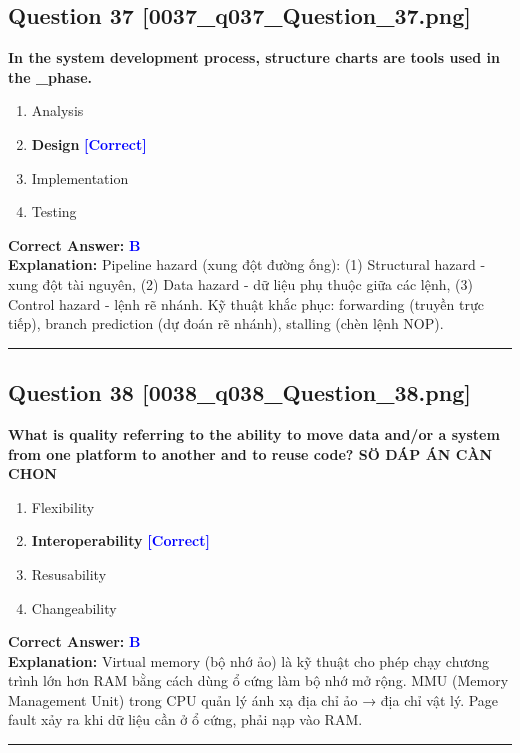 \documentclass[11pt,a4paper]{article}
\begin{document}
\begin{minipage}{\textwidth}
\subsection*{Question 37 \quad \footnotesize{[0037\_q037\_Question\_37.png]}}
\noindent \textbf{In the system development process, structure charts are tools used in the \_phase.}

\begin{enumerate}[label=\Alph*.]
    \item Analysis
    \item \textbf{Design} \hfill \textcolor{blue}{\textbf{[Correct]}}
    \item Implementation
    \item Testing
\end{enumerate}

\noindent \textbf{Correct Answer:} \textcolor{blue}{\textbf{B}} \\[2pt]
\noindent \textbf{Explanation:} Pipeline hazard (xung đột đường ống): (1) Structural hazard - xung đột tài nguyên, (2) Data hazard - dữ liệu phụ thuộc giữa các lệnh, (3) Control hazard - lệnh rẽ nhánh. Kỹ thuật khắc phục: forwarding (truyền trực tiếp), branch prediction (dự đoán rẽ nhánh), stalling (chèn lệnh NOP).

\par\vspace{0.3cm}
\hrule
\vspace{0.3cm}
\end{minipage}

\begin{minipage}{\textwidth}
\subsection*{Question 38 \quad \footnotesize{[0038\_q038\_Question\_38.png]}}
\noindent \textbf{What is quality referring to the ability to move data and/or a system from one platform to another and to reuse code? SÖ DÁP ÁN CÀN CHON}

\begin{enumerate}[label=\Alph*.]
    \item Flexibility
    \item \textbf{Interoperability} \hfill \textcolor{blue}{\textbf{[Correct]}}
    \item Resusability
    \item Changeability
\end{enumerate}

\noindent \textbf{Correct Answer:} \textcolor{blue}{\textbf{B}} \\[2pt]
\noindent \textbf{Explanation:} Virtual memory (bộ nhớ ảo) là kỹ thuật cho phép chạy chương trình lớn hơn RAM bằng cách dùng ổ cứng làm bộ nhớ mở rộng. MMU (Memory Management Unit) trong CPU quản lý ánh xạ địa chỉ ảo → địa chỉ vật lý. Page fault xảy ra khi dữ liệu cần ở ổ cứng, phải nạp vào RAM.

\par\vspace{0.3cm}
\hrule
\vspace{0.3cm}
\end{minipage}
\end{document}
